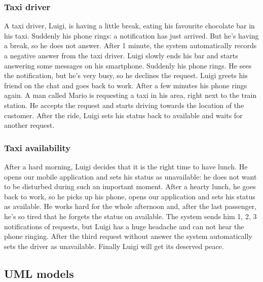 \subsubsection{Taxi driver}
A taxi driver, Luigi, is having a little break, eating his favourite chocolate bar in his taxi. Suddenly
his phone rings: a notification has just arrived. But he's having a break, so he does not answer.
After 1 minute, the system automatically records a negative answer from the taxi driver.
Luigi slowly ends his bar and starts answering some messages on his smartphone. Suddenly his phone
rings. He sees the notification, but he's very busy, so he declines the request. Luigi greets his
friend on the chat and goes back to work. After a few minutes his phone rings again. A man called
Mario is requesting a taxi in his area, right next to the train station. He accepts the request and
starts driving towards the location of the customer. After the ride, Luigi sets his status back to
available and waits for another request.
\subsubsection{Taxi availability}
After a hard morning, Luigi decides that it is the right time to have lunch. He opens our mobile
application and sets his status as unavailable: he does not want to be disturbed during such an
important moment. After a hearty lunch, he goes back to work, so he picks up his phone, opens our
application and sets his status as available. He works hard for the whole afternoon and, after the
last passenger, he's so tired that he forgets the status on available. The system sends him 1, 2, 3
notifications of requests, but Luigi has a huge headache and can not hear the phone ringing. After
the third request without answer the system automatically sets the driver as unavailable.
Finally Luigi will get its deserved peace.
\newpage
\subsection{UML models}
